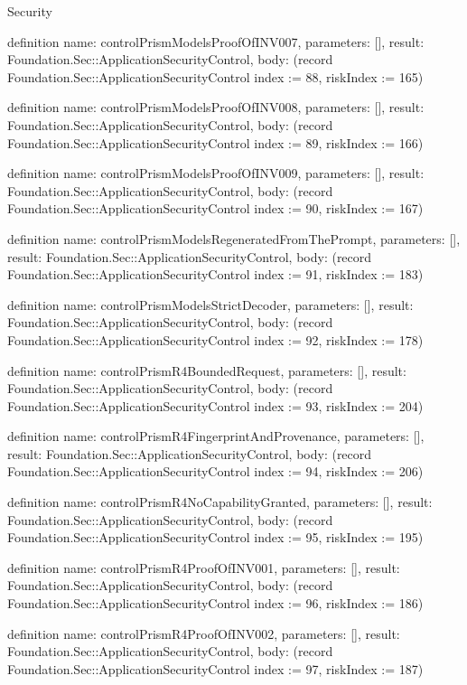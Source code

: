 \begin{lexlean}{Security}
\begin{semanticmodule}
definition{
  name: controlPrismModelsProofOfINV007,
  parameters: [],
  result: Foundation.Sec::ApplicationSecurityControl,
  body: (record Foundation.Sec::ApplicationSecurityControl {index := 88, riskIndex := 165})
}

definition{
  name: controlPrismModelsProofOfINV008,
  parameters: [],
  result: Foundation.Sec::ApplicationSecurityControl,
  body: (record Foundation.Sec::ApplicationSecurityControl {index := 89, riskIndex := 166})
}

definition{
  name: controlPrismModelsProofOfINV009,
  parameters: [],
  result: Foundation.Sec::ApplicationSecurityControl,
  body: (record Foundation.Sec::ApplicationSecurityControl {index := 90, riskIndex := 167})
}

definition{
  name: controlPrismModelsRegeneratedFromThePrompt,
  parameters: [],
  result: Foundation.Sec::ApplicationSecurityControl,
  body: (record Foundation.Sec::ApplicationSecurityControl {index := 91, riskIndex := 183})
}

definition{
  name: controlPrismModelsStrictDecoder,
  parameters: [],
  result: Foundation.Sec::ApplicationSecurityControl,
  body: (record Foundation.Sec::ApplicationSecurityControl {index := 92, riskIndex := 178})
}

definition{
  name: controlPrismR4BoundedRequest,
  parameters: [],
  result: Foundation.Sec::ApplicationSecurityControl,
  body: (record Foundation.Sec::ApplicationSecurityControl {index := 93, riskIndex := 204})
}

definition{
  name: controlPrismR4FingerprintAndProvenance,
  parameters: [],
  result: Foundation.Sec::ApplicationSecurityControl,
  body: (record Foundation.Sec::ApplicationSecurityControl {index := 94, riskIndex := 206})
}

definition{
  name: controlPrismR4NoCapabilityGranted,
  parameters: [],
  result: Foundation.Sec::ApplicationSecurityControl,
  body: (record Foundation.Sec::ApplicationSecurityControl {index := 95, riskIndex := 195})
}

definition{
  name: controlPrismR4ProofOfINV001,
  parameters: [],
  result: Foundation.Sec::ApplicationSecurityControl,
  body: (record Foundation.Sec::ApplicationSecurityControl {index := 96, riskIndex := 186})
}

definition{
  name: controlPrismR4ProofOfINV002,
  parameters: [],
  result: Foundation.Sec::ApplicationSecurityControl,
  body: (record Foundation.Sec::ApplicationSecurityControl {index := 97, riskIndex := 187})
}


\end{semanticmodule}
\end{lexlean}
